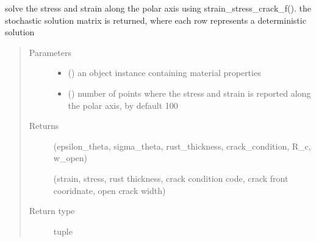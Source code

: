 \documentclass[letterpaper,10pt,english]{sphinxmanual}
\begin{document}

\begin{fulllineitems}
\label{\detokenize{cracking:cracking.solve_stress_strain_crack_stochastic}}
\sphinxAtStartPar
solve the stress and strain along the polar axis using strain\_stress\_crack\_f().
the stochastic solution matrix is returned, where each row represents a deterministic solution
\begin{quote}\begin{description}
\item[{Parameters}] \leavevmode\begin{itemize}
\item {} 
\sphinxAtStartPar
{} () \textendash{} an object instance containing material properties

\item {} 
\sphinxAtStartPar
{} (\sphinxstyleliteralemphasis{\sphinxupquote{, }}) \textendash{} number of points where the stress and strain is reported along
the polar axis, by default 100

\end{itemize}

\item[{Returns}] \leavevmode
\sphinxAtStartPar

\sphinxAtStartPar
(epsilon\_theta, sigma\_theta, rust\_thickness,
crack\_condition, R\_c, w\_open)

\sphinxAtStartPar
(strain, stress, rust thickness,
crack condition code, crack front cooridnate, open crack width)


\item[{Return type}] \leavevmode
\sphinxAtStartPar
tuple

\end{description}\end{quote}

\end{fulllineitems}
\end{document}
